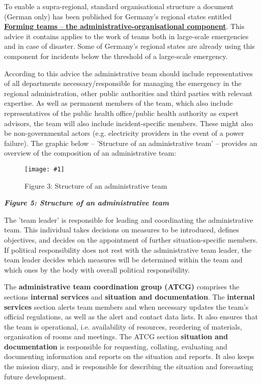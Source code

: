 \documentclass{article}
\newlength{\imgwidth}
\newcommand\scaledgraphics[2]{%
                
\settowidth{\imgwidth}{\texttt{[image: \#1]}}%
                
\setlength{\imgwidth}{\minof{\imgwidth}{#2\textwidth}}%
                
\texttt{[image: \#1]}%
                
}
\begin{document}
To enable a supra-regional, standard organisational structure a document (German only) has been published for Germany's regional states entitled\textbf{ }\textbf{\href{http://www.bbk.bund.de/SharedDocs/Downloads/BBK/DE/FIS/DownloadsRechtundVorschriften/IMKBeschluesse/IMK174TOP26Anlg2.pdf}{Forming teams}}\href{http://www.bbk.bund.de/SharedDocs/Downloads/BBK/DE/FIS/DownloadsRechtundVorschriften/IMKBeschluesse/IMK174TOP26Anlg2.pdf}{ – }\textbf{\href{http://www.bbk.bund.de/SharedDocs/Downloads/BBK/DE/FIS/DownloadsRechtundVorschriften/IMKBeschluesse/IMK174TOP26Anlg2.pdf}{the administrative-organisational component}}. This advice it contains\textbf{ }applies to the work of teams both in large-scale emergencies and in case of disaster. Some of Germany's regional states are already using this component for incidents below the threshold of a large-scale emergency.


According to this advice the administrative team should include representatives of all departments necessary/responsible for managing the emergency in the regional administration, other public authorities and third parties with relevant expertise. As well as permanent members of the team, which also include representatives of the public health office/public health authority as expert advisors, the team will also include incident-specific members. These might also be non-governmental actors (e.g. electricity providers in the event of a power failure). The graphic below – 'Structure of an administrative team' – provides an overview of the composition of an administrative team:

\begin{figure}
\scaledgraphics{80d2b269-76f8-43ca-83a3-e341c4f08917.png}{1}
\caption*{Figure 3: Structure of an administrative team}\label{F10464411}
\end{figure}


\emph{\textbf{Figure 5: Structure of an administrative team}}


The 'team leader' is responsible for leading and coordinating the administrative team. This individual takes decisions on measures to be introduced, defines objectives, and decides on the appointment of further situation-specific members. If political responsibility does not rest with the administrative team leader, the team leader decides which measures will be determined within the team and which ones by the body with overall political responsibility.


The \textbf{administrative team coordination group (ATCG)} comprises the sections \textbf{internal services} and \textbf{situation and documentation}. The \textbf{internal services} section alerts team members and when necessary updates the team's official regulations, as well as the alert and contact data lists. It also ensures that the team is operational, i.e. availability of resources, reordering of materials, organisation of rooms and meetings. The ATCG section \textbf{situation and documentation} is responsible for requesting, collating, evaluating and documenting information and reports on the situation and reports. It also keeps the mission diary, and is responsible for describing the situation and forecasting future development.
\end{document}
